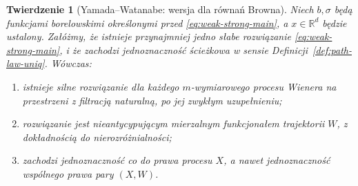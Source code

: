 \documentclass[11pt,a4paper,oneside]{report}
\numberwithin{equation}{chapter}
\theoremstyle{plain}
\newtheorem{twierdzenie}{Twierdzenie}[chapter]
\theoremstyle{definition}
\theoremstyle{remark}
\newcommand{\R}{\mathbb{R}}
\begin{document}
\begin{twierdzenie}[Yamada--Watanabe: wersja dla równań Browna]\label{thm:volIII:14:01}
\label{th:YW}
Niech $b,\sigma$ będą funkcjami borelowskimi określonymi
przed \eqref{eq:weak-strong-main}, a $x\in\R^d$ będzie
ustalony. Załóżmy, że istnieje przynajmniej jedno słabe
rozwiązanie \eqref{eq:weak-strong-main}, i że zachodzi
jednoznaczność ścieżkowa w sensie
Definicji~\ref{def:path-law-uniq}. Wówczas:
\begin{enumerate}
\item istnieje silne rozwiązanie dla każdego $m$-wymiarowego
procesu Wienera na przestrzeni z filtracją naturalną,
po jej zwykłym uzupełnieniu;
\item rozwiązanie jest nieantycypującym mierzalnym funkcjonałem
trajektorii $W$, z dokładnością do nierozróżnialności;
\item zachodzi jednoznaczność co do prawa procesu $X$,
a nawet jednoznaczność wspólnego prawa pary $(X,W)$.
\end{enumerate}
\end{twierdzenie}
\end{document}
